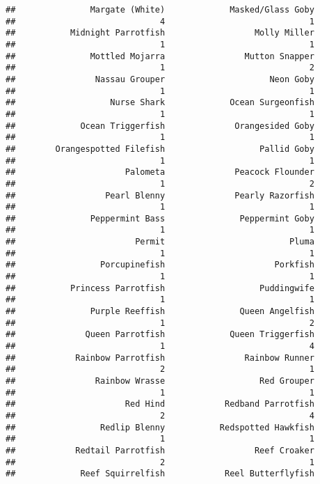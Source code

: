 \documentclass[
]{article}
\begin{document}
\begin{verbatim}
##               Margate (White)             Masked/Glass Goby 
##                             4                             1 
##           Midnight Parrotfish                  Molly Miller 
##                             1                             1 
##               Mottled Mojarra                Mutton Snapper 
##                             1                             2 
##                Nassau Grouper                     Neon Goby 
##                             1                             1 
##                   Nurse Shark             Ocean Surgeonfish 
##                             1                             1 
##             Ocean Triggerfish              Orangesided Goby 
##                             1                             1 
##        Orangespotted Filefish                   Pallid Goby 
##                             1                             1 
##                      Palometa              Peacock Flounder 
##                             1                             2 
##                  Pearl Blenny              Pearly Razorfish 
##                             1                             1 
##               Peppermint Bass               Peppermint Goby 
##                             1                             1 
##                        Permit                         Pluma 
##                             1                             1 
##                 Porcupinefish                      Porkfish 
##                             1                             1 
##           Princess Parrotfish                   Puddingwife 
##                             1                             1 
##               Purple Reeffish               Queen Angelfish 
##                             1                             2 
##              Queen Parrotfish             Queen Triggerfish 
##                             1                             4 
##            Rainbow Parrotfish                Rainbow Runner 
##                             2                             1 
##                Rainbow Wrasse                   Red Grouper 
##                             1                             1 
##                      Red Hind            Redband Parrotfish 
##                             2                             4 
##                 Redlip Blenny           Redspotted Hawkfish 
##                             1                             1 
##            Redtail Parrotfish                  Reef Croaker 
##                             2                             1 
##             Reef Squirrelfish            Reel Butterflyfish 

\end{verbatim}
\end{document}
